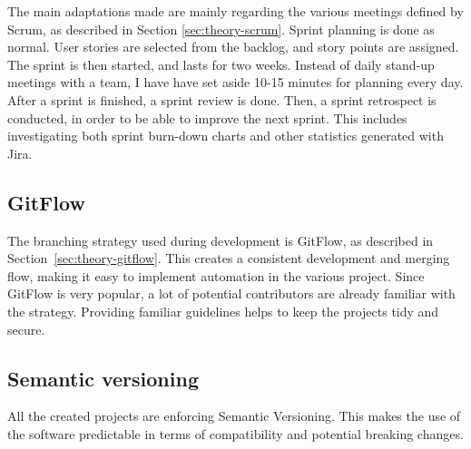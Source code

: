 The main adaptations made are mainly regarding the various meetings defined by Scrum, as described in Section \ref{sec:theory-scrum}. Sprint planning is done as normal. User stories are selected from the backlog, and story points are assigned. The sprint is then started, and lasts for two weeks. Instead of daily stand-up meetings with a team, I have have set aside 10-15 minutes for planning every day. After a sprint is finished, a sprint review is done. Then, a sprint retrospect is conducted, in order to be able to improve the next sprint. This includes investigating both sprint burn-down charts and other statistics generated with Jira.

\subsection{GitFlow}
The branching strategy used during development is GitFlow, as described in Section~\ref{sec:theory-gitflow}. This creates a consistent development and merging flow, making it easy to implement automation in the various project. Since GitFlow is very popular, a lot of potential contributors are already familiar with the strategy. Providing familiar guidelines helps to keep the projects tidy and secure.

\subsection{Semantic versioning}
All the created projects are enforcing Semantic Versioning. This makes the use of the software predictable in terms of compatibility and potential breaking changes.

